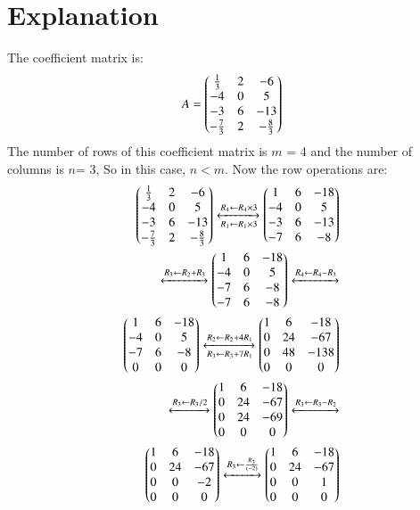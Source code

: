 \documentclass[journal,12pt,twocolumn]{IEEEtran}
\begin{document}
\section{Explanation}
The coefficient matrix is:
\begin{align}
A=\begin{pmatrix}\frac{1}{3} & 2 & -6\\-4 & 0 & 5\\-3 & 6 & -13\\-\frac{7}{3} & 2 & -\frac{8}{3}\end{pmatrix}
\end{align}
The number of rows of this coefficient matrix is $m$ = 4 and the number of columns is $n$= 3, So in this case, $n<m$.
Now the row operations are:
\begin{align}
\myvec{\frac{1}{3} & 2 & -6\\-4 & 0 & 5\\-3 & 6 & -13\\-\frac{7}{3} & 2 & -\frac{8}{3}}\xleftrightarrow[R_1\leftarrow R_1\times3]{R_4\leftarrow R_4\times3}
\myvec{1 & 6 & -18\\-4 & 0 & 5\\-3 & 6 & -13\\-7 & 6 & -8}\\
\xleftrightarrow[]{R_3\leftarrow R_2+R_3}
\myvec{1 & 6 & -18\\-4 & 0 & 5\\-7 & 6 & -8\\-7 & 6 & -8}\xleftrightarrow[]{R_4\leftarrow R_4-R_3}\\
\myvec{1 & 6 & -18\\-4 & 0 & 5\\-7 & 6 & -8\\0 & 0 & 0}\xleftrightarrow[R_3\leftarrow R_3+7R_1]{R_2\leftarrow R_2+4R_1}
\myvec{1 & 6 & -18\\0 & 24 & -67\\0 & 48 & -138\\0 & 0 & 0}\\
\xleftrightarrow[]{R_3\leftarrow R_3/2}\myvec{1 & 6 & -18\\0 & 24 & -67\\0 & 24 & -69\\0 & 0 & 0}\xleftrightarrow[]{R_3\leftarrow R_3-R_2}\\
\myvec{1 & 6 & -18\\0 & 24 & -67\\0 & 0 & -2\\0 & 0 & 0}\xleftrightarrow[]{R_3\leftarrow \frac{R_3}{(-2)}}
\myvec{1 & 6 & -18\\0 & 24 & -67\\0 & 0 & 1\\0 & 0 & 0}\\

\end{align}
\end{document}
